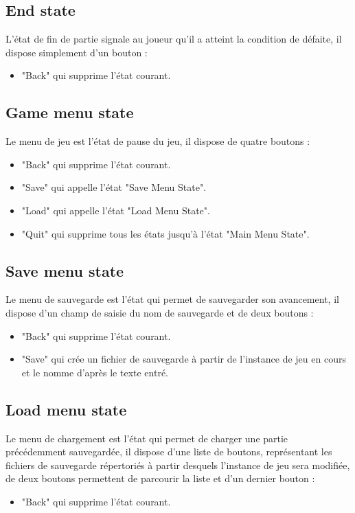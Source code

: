 \documentclass[a4paper]{memoir}
\begin{document}
			\subsection{End state}
				L’état de fin de partie signale au joueur qu’il a atteint la condition de défaite, il dispose simplement d’un bouton :
				\begin{itemize}[label=$\bullet$]
					\item "Back" qui supprime l’état courant.
				\end{itemize}
				
			\subsection{Game menu state}
				Le menu de jeu est l’état de pause du jeu, il dispose de quatre boutons :
				\begin{itemize}[label=$\bullet$]
					\item "Back" qui supprime l’état courant.
					\item "Save" qui appelle l’état "Save Menu State".
					\item "Load" qui appelle l’état "Load Menu State".
					\item "Quit" qui supprime tous les états jusqu’à l’état "Main Menu State".
				\end{itemize}
				
			\subsection{Save menu state}
				Le menu de sauvegarde est l’état qui permet de sauvegarder son avancement, il dispose d’un champ de saisie du nom de sauvegarde et de deux boutons :
				\begin{itemize}[label=$\bullet$]
					\item "Back" qui supprime l’état courant.
					\item "Save" qui crée un fichier de sauvegarde à partir de l’instance de jeu en cours et le nomme d’après le texte entré.
				\end{itemize}
				
			\subsection{Load menu state}
				Le menu de chargement est l’état qui permet de charger une partie précédemment sauvegardée, il dispose d’une liste de boutons, représentant les fichiers de sauvegarde répertoriés à partir desquels l’instance de jeu sera modifiée, de deux boutons permettent de parcourir la liste et d’un dernier bouton :
				\begin{itemize}[label=$\bullet$]
					\item "Back" qui supprime l’état courant.
				\end{itemize}
			
\end{document}
